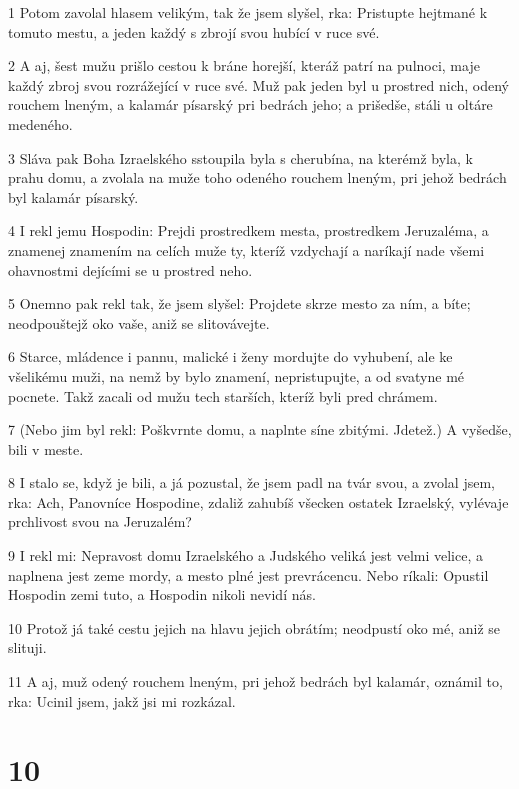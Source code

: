 \par 1 Potom zavolal hlasem velikým, tak že jsem slyšel, rka: Pristupte hejtmané k tomuto mestu, a jeden každý s zbrojí svou hubící v ruce své.
\par 2 A aj, šest mužu prišlo cestou k bráne horejší, kteráž patrí na pulnoci, maje každý zbroj svou rozrážející v ruce své. Muž pak jeden byl u prostred nich, odený rouchem lneným, a kalamár písarský pri bedrách jeho; a prišedše, stáli u oltáre medeného.
\par 3 Sláva pak Boha Izraelského sstoupila byla s cherubína, na kterémž byla, k prahu domu, a zvolala na muže toho odeného rouchem lneným, pri jehož bedrách byl kalamár písarský.
\par 4 I rekl jemu Hospodin: Prejdi prostredkem mesta, prostredkem Jeruzaléma, a znamenej znamením na celích muže ty, kteríž vzdychají a naríkají nade všemi ohavnostmi dejícími se u prostred neho.
\par 5 Onemno pak rekl tak, že jsem slyšel: Projdete skrze mesto za ním, a bíte; neodpouštejž oko vaše, aniž se slitovávejte.
\par 6 Starce, mládence i pannu, malické i ženy mordujte do vyhubení, ale ke všelikému muži, na nemž by bylo znamení, nepristupujte, a od svatyne mé pocnete. Takž zacali od mužu tech starších, kteríž byli pred chrámem.
\par 7 (Nebo jim byl rekl: Poškvrnte domu, a naplnte síne zbitými. Jdetež.) A vyšedše, bili v meste.
\par 8 I stalo se, když je bili, a já pozustal, že jsem padl na tvár svou, a zvolal jsem, rka: Ach, Panovníce Hospodine, zdaliž zahubíš všecken ostatek Izraelský, vylévaje prchlivost svou na Jeruzalém?
\par 9 I rekl mi: Nepravost domu Izraelského a Judského veliká jest velmi velice, a naplnena jest zeme mordy, a mesto plné jest prevrácencu. Nebo ríkali: Opustil Hospodin zemi tuto, a Hospodin nikoli nevidí nás.
\par 10 Protož já také cestu jejich na hlavu jejich obrátím; neodpustí oko mé, aniž se slituji.
\par 11 A aj, muž odený rouchem lneným, pri jehož bedrách byl kalamár, oznámil to, rka: Ucinil jsem, jakž jsi mi rozkázal.

\chapter{10}

